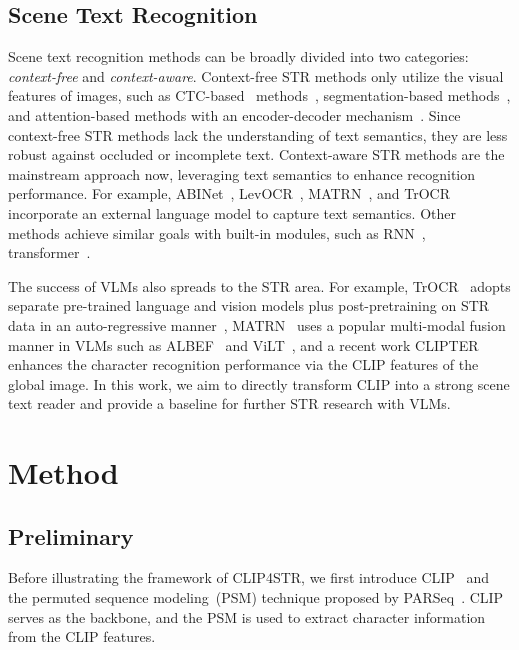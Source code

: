 \documentclass[lettersize,journal]{IEEEtran}
\begin{document}
\subsection{Scene Text Recognition}
Scene text recognition methods can be broadly divided into
two categories: \textit{context-free} and \textit{context-aware}.
Context-free STR methods only utilize the visual features of images, such as CTC-based~\cite{2006_ctc} methods~\cite{2016_he_reading,2017_shi_end2end,2018_fedor_rosetta,atienza2021vision},
segmentation-based methods~\cite{2019_luo_scene,2022_wan_textscanner,2022_zhao_bgi}, and attention-based methods with an encoder-decoder mechanism~\cite{2017_cheng_fan,2019_shi_aster}.
Since context-free STR methods lack the understanding of text semantics, they are less robust against occluded or incomplete text.
Context-aware STR methods are the mainstream approach now, leveraging text semantics to enhance recognition performance.
For example, ABINet~\cite{2021_abinet}, LevOCR~\cite{2022_levocr}, MATRN~\cite{2022_matrn}, and TrOCR~\cite{li2021trocr} incorporate an external language model to capture text semantics.
Other methods achieve similar goals with built-in modules, such as RNN~\cite{2016_lee_rrn}, transformer~\cite{2019_NRTR,2022_parseq}.

The success of VLMs also spreads to the STR area.
For example,  TrOCR~\cite{li2021trocr} adopts separate pre-trained language and vision models plus post-pretraining on STR data in an auto-regressive manner~\cite{radford2019language},
MATRN~\cite{2022_matrn} uses a popular multi-modal fusion manner in VLMs such as ALBEF~\cite{2021_li_albef} and ViLT~\cite{pmlr-v139-kim21k},
and a recent work CLIPTER~\cite{abs-2301-07464} enhances the character recognition performance via the CLIP features of the global image.
In this work, we aim to directly transform CLIP into a strong scene text reader and provide a baseline for further STR research with VLMs.  
\section{Method}

\subsection{Preliminary} \label{sec:prelim}
Before illustrating the framework of CLIP4STR,
we first introduce CLIP~\cite{2021-clip} and the permuted
sequence modeling~(PSM) technique proposed by PARSeq~\cite{2022_parseq}.
CLIP serves as the backbone, and
the PSM is used to extract character information from the CLIP features.
\end{document}
